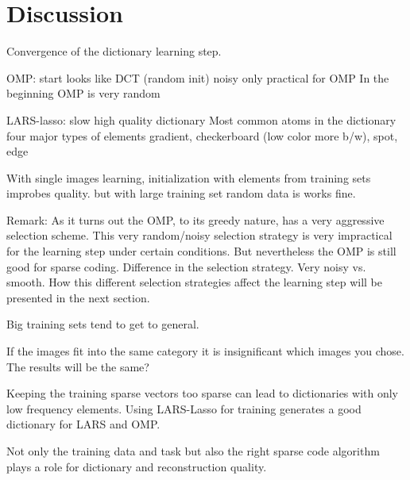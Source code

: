 \chapter{Discussion}



Convergence of the dictionary learning step.

OMP:
  start looks like DCT (random init)
  noisy
  only practical for OMP
  In the beginning OMP is very random

LARS-lasso:
  slow 
  high quality dictionary
  Most common atoms in the dictionary 
  four major types of elements
  gradient, checkerboard (low color more b/w), spot, edge



With single images learning, initialization with elements from training sets
improbes quality. but with large training set random data is works fine.


Remark:
As it turns out the OMP, to its greedy nature, has a very aggressive selection
scheme. This very random/noisy selection strategy is very impractical
for the \trainDL learning step under certain conditions. 
But nevertheless the OMP is still good for
sparse coding. 
Difference in the selection strategy.
Very noisy vs. smooth. 
How this different selection strategies affect the learning step will be
presented in the next section.

Big training sets tend to get to general.

If the images fit into the same category it is insignificant which images you
chose. The results will be the same?

Keeping the training sparse vectors too sparse can lead to dictionaries with
only low frequency elements. Using LARS-Lasso for training generates a good
dictionary for LARS and OMP. 




Not only the training data and task but also the right
sparse code algorithm plays a role for dictionary and reconstruction quality.

